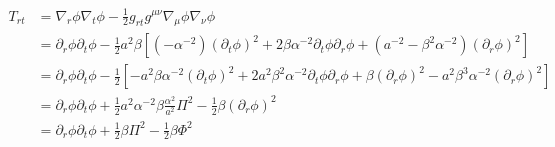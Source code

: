 \documentclass[12pt]{article}
\numberwithin{equation}{section}
\begin{document}
\begin{equation*}
\begin{aligned}
T_{rt} &= \nabla_r \phi \nabla_t \phi - \frac{1}{2} g_{rt} g^{\mu \nu} \nabla_{\mu} \phi \nabla_{\nu} \phi \\
&= \partial_r \phi \partial_t \phi - \frac{1}{2} a^2 \beta [(-\alpha^{-2}) (\partial_t \phi)^2 + 2 \beta \alpha^{-2} \partial_t \phi \partial_r \phi + (a^{-2} - \beta^2 \alpha^{-2}) (\partial_r \phi)^2] \\
&= \partial_r \phi \partial_t \phi - \frac{1}{2} [- a^2 \beta \alpha^{-2} (\partial_t \phi)^2 + 2 a^2 \beta^2 \alpha^{-2} \partial_t \phi \partial_r \phi + \beta (\partial_r \phi)^2 - a^2 \beta^3 \alpha^{-2}(\partial_r \phi)^2] \\
&= \partial_r \phi \partial_t \phi + \frac{1}{2} a^2 \alpha^{-2} \beta \frac{\alpha^2}{a^2} \Pi^2 - \frac{1}{2} \beta (\partial_r \phi)^2 \\
&= \partial_r \phi \partial_t \phi + \frac{1}{2} \beta \Pi^2 - \frac{1}{2} \beta \Phi^2 \\
\end{aligned}
\end{equation*}
\end{document}
